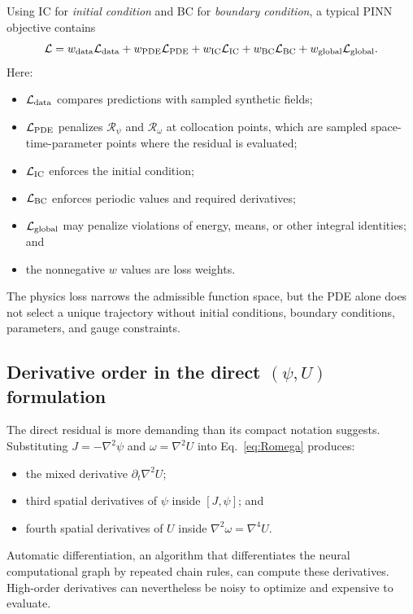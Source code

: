 \documentclass[11pt]{article}
\newcommand{\Rpsi}{\mathcal{R}_{\psi}}
\newcommand{\Romega}{\mathcal{R}_{\omega}}
\begin{document}
Using IC for \emph{initial condition} and BC for \emph{boundary condition}, a typical PINN objective contains
\begin{equation}
\mathcal{L}
=w_{\rm data}\mathcal{L}_{\rm data}
+w_{\rm PDE}\mathcal{L}_{\rm PDE}
+w_{\rm IC}\mathcal{L}_{\rm IC}
+w_{\rm BC}\mathcal{L}_{\rm BC}
+w_{\rm global}\mathcal{L}_{\rm global}.
\end{equation}
Here:
\begin{itemize}
  \item $\mathcal{L}_{\rm data}$ compares predictions with sampled synthetic fields;
  \item $\mathcal{L}_{\rm PDE}$ penalizes $\Rpsi$ and $\Romega$ at collocation points, which are sampled space-time-parameter points where the residual is evaluated;
  \item $\mathcal{L}_{\rm IC}$ enforces the initial condition;
  \item $\mathcal{L}_{\rm BC}$ enforces periodic values and required derivatives;
  \item $\mathcal{L}_{\rm global}$ may penalize violations of energy, means, or other integral identities; and
  \item the nonnegative $w$ values are loss weights.
\end{itemize}
The physics loss narrows the admissible function space, but the PDE alone does not select a unique trajectory without initial conditions, boundary conditions, parameters, and gauge constraints.

\subsection{Derivative order in the direct $(\psi,U)$ formulation}

The direct residual is more demanding than its compact notation suggests. Substituting $J=-\nabla^2\psi$ and $\omega=\nabla^2U$ into Eq.~\eqref{eq:Romega} produces:
\begin{itemize}
  \item the mixed derivative $\partial_t\nabla^2U$;
  \item third spatial derivatives of $\psi$ inside $[J,\psi]$; and
  \item fourth spatial derivatives of $U$ inside $\nabla^2\omega=\nabla^4U$.
\end{itemize}
Automatic differentiation, an algorithm that differentiates the neural computational graph by repeated chain rules, can compute these derivatives. High-order derivatives can nevertheless be noisy to optimize and expensive to evaluate.
\end{document}
